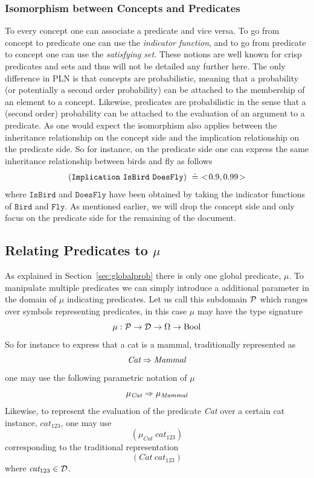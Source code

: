 \documentclass[]{article}
\begin{document}
\subsubsection{Isomorphism between Concepts and Predicates}
To every concept one can associate a predicate and vice versa.  To go
from concept to predicate one can use the \emph{indicator function},
and to go from predicate to concept one can use the \emph{satisfying
set}.  These notions are well known for crisp predicates and sets and
thus will not be detailed any further here.  The only difference in
PLN is that concepts are probabilistic, meaning that a probability (or
potentially a second order probability) can be attached to the
membership of an element to a concept.  Likewise, predicates are
probabilistic in the sense that a (second order) probability can be
attached to the evaluation of an argument to a predicate.  As one
would expect the isomorphism also applies between the inheritance
relationship on the concept side and the implication relationship on
the predicate side.  So for instance, on the predicate side one can
express the same inheritance relationship between birds and fly as
follows
$$(\texttt{Implication}\ \texttt{IsBird}\ \texttt{DoesFly})\ \measeq\ \STV{0.9}{0.99}$$
where $\texttt{IsBird}$ and $\texttt{DoesFly}$ have been obtained by
taking the indicator functions of $\texttt{Bird}$ and $\texttt{Fly}$.
As mentioned earlier, we will drop the concept side and only focus on
the predicate side for the remaining of the document.

\subsection{Relating Predicates to \texorpdfstring{$\mu$}{mu}}
As explained in Section~\ref{sec:globalprob} there is only one global
predicate, $\mu$.  To manipulate multiple predicates we can simply
introduce a additional parameter in the domain of $\mu$ indicating
predicates.  Let us call this subdomain $\mathcal{P}$ which ranges over
symbols representing predicates, in this case $\mu$ may have the type
signature
$$\mu : \mathcal{P} \to \mathcal{D} \to \Omega \to \textup{Bool}$$ So for instance
to express that a cat is a mammal, traditionally represented as
$$\textit{Cat} \Rightarrow \textit{Mammal}$$ one may use the following
parametric notation of $\mu$
$$\mu_{\textit{Cat}} \Rightarrow \mu_{\textit{Mammal}}$$ Likewise, to
represent the evaluation of the predicate \textit{Cat} over a certain
cat instance, $\textit{cat}_{123}$, one may use
$$(\mu_{\textit{Cat}}\ \textit{cat}_{123})$$ corresponding to
the traditional representation
$$(\textit{Cat}\ \textit{cat}_{123})$$ where $\textit{cat}_{123} \in
\mathcal{D}$.
\end{document}
